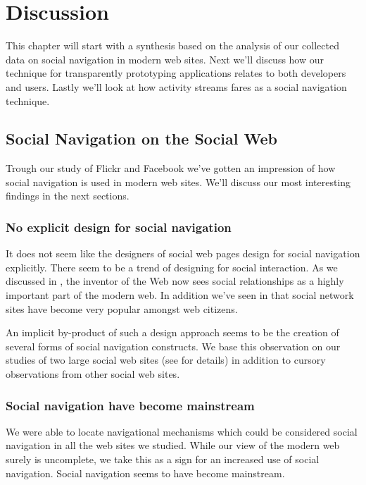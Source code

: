 \chapter{Discussion}
\label{chapter:discussion}

This chapter will start with a synthesis based on the analysis of our
collected data on social navigation in modern web sites.
Next we'll discuss how our technique for transparently prototyping
applications relates to both developers and users. Lastly we'll look at how
activity streams fares as a social navigation technique.

\section{Social Navigation on the Social Web}

Trough our study of Flickr and Facebook we've gotten an impression of how
social navigation is used in modern web sites. We'll discuss our most
interesting findings in the next sections.

\subsection{No explicit design for social navigation}

It does not seem like the designers of social web pages design for social
navigation explicitly. There seem to be a trend of designing for social
interaction. As we discussed in
, the inventor of the Web
now sees social relationships as a highly important part of the modern web.
In addition we've seen in
that social network sites have become very popular amongst web citizens.

An implicit by-product of such a design approach seems to be
the creation of several forms of social navigation constructs.
We base this observation on our studies of two large social web sites
(see  for details)
in addition to cursory observations from other social web sites.

\subsection{Social navigation have become mainstream}

We were able to locate navigational mechanisms which could be considered
social navigation in all the web sites we studied. While our view of the
modern web surely is uncomplete, we take this as a sign for an increased use
of social navigation. Social navigation seems to have become mainstream.

